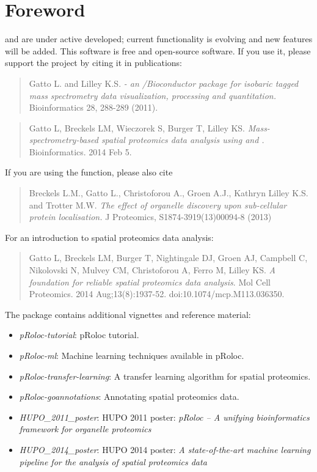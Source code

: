 \section*{Foreword}

 and  are under active developed;
current functionality is evolving and new features will be added.
This software is free and open-source software.  If you use it, please
support the project by citing it in publications:

\begin{quote}
  Gatto L. and Lilley K.S. \emph{ - an \R/Bioconductor
    package for isobaric tagged mass spectrometry data visualization,
    processing and quantitation.} Bioinformatics 28, 288-289 (2011).
\end{quote}

\begin{quote}
  Gatto L, Breckels LM, Wieczorek S, Burger T, Lilley KS.
  \textit{Mass-spectrometry-based spatial proteomics data analysis
    using  and .}
  Bioinformatics. 2014 Feb 5.
\end{quote}

If you are using the  function, please also cite

\begin{quote}
  Breckels L.M., Gatto L., Christoforou A., Groen A.J., Kathryn Lilley
  K.S. and Trotter M.W.  \emph{The effect of organelle discovery upon
    sub-cellular protein localisation.}  J Proteomics,
  S1874-3919(13)00094-8 (2013)
\end{quote}

For an introduction to spatial proteomics data analysis:

\begin{quote}
  Gatto L, Breckels LM, Burger T, Nightingale DJ, Groen AJ, Campbell
  C, Nikolovski N, Mulvey CM, Christoforou A, Ferro M, Lilley
  KS. \emph{A foundation for reliable spatial proteomics data
    analysis}. Mol Cell Proteomics. 2014
  Aug;13(8):1937-52. doi:10.1074/mcp.M113.036350.
\end{quote}

The  package contains additional vignettes and
reference material:

\begin{itemize}
\item \emph{pRoloc-tutorial}: pRoloc tutorial.
\item \emph{pRoloc-ml}: Machine learning techniques available in pRoloc.
\item \emph{pRoloc-transfer-learning}: A transfer learning algorithm
  for spatial proteomics.
\item \emph{pRoloc-goannotations}: Annotating spatial proteomics data.
\item \emph{HUPO\_2011\_poster}: HUPO 2011 poster: \textit{pRoloc -- A
    unifying bioinformatics framework for organelle proteomics}
\item \textit{HUPO\_2014\_poster}: HUPO 2014 poster: \textit{A
    state-of-the-art machine learning pipeline for the analysis of
    spatial proteomics data}
\end{itemize}